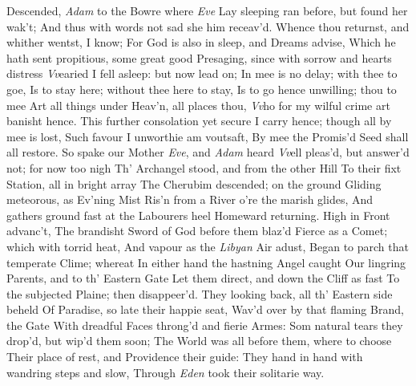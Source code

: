 \documentclass[11pt]{book}
\begin{document}
Descended, \textit{Adam} to the Bowre where \textit{Eve} 
Lay sleeping ran before, but found her wak't; 
And thus with words not sad she him receav'd. 
\quad Whence thou returnst, and whither wentst, I know; 
For God is also in sleep, and Dreams advise, 
Which he hath sent propitious, some great good 
Presaging, since with sorrow and hearts distress 
\textit{Vv}earied I fell asleep: but now lead on; 
In mee is no delay; with thee to goe, 
Is to stay here; without thee here to stay, 
Is to go hence unwilling; thou to mee 
Art all things under Heav'n, all places thou, 
\textit{Vv}ho for my wilful crime art banisht hence. 
This further consolation yet secure 
I carry hence; though all by mee is lost, 
Such favour I unworthie am voutsaft, 
By mee the Promis'd Seed shall all restore. 
\quad So spake our Mother \textit{Eve}, and \textit{Adam} heard 
\textit{Vv}ell pleas'd, but answer'd not; for now too nigh 
Th' Archangel stood, and from the other Hill 
To their fixt Station, all in bright array 
The Cherubim descended; on the ground 
Gliding meteorous, as Ev'ning Mist 
Ris'n from a River o're the marish glides, 
And gathers ground fast at the Labourers heel 
Homeward returning.  High in Front advanc't, 
The brandisht Sword of God before them blaz'd 
Fierce as a Comet; which with torrid heat, 
And vapour as the \textit{Libyan} Air adust, 
Began to parch that temperate Clime; whereat 
In either hand the hastning Angel caught 
Our lingring Parents, and to th' Eastern Gate 
Let them direct, and down the Cliff as fast 
To the subjected Plaine; then disappeer'd. 
They looking back, all th' Eastern side beheld 
Of Paradise, so late their happie seat, 
Wav'd over by that flaming Brand, the Gate 
With dreadful Faces throng'd and fierie Armes: 
Som natural tears they drop'd, but wip'd them soon; 
The World was all before them, where to choose 
Their place of rest, and Providence their guide: 
They hand in hand with wandring steps and slow, 
Through \textit{Eden} took their solitarie way. 
\endVersus
\end{document}
